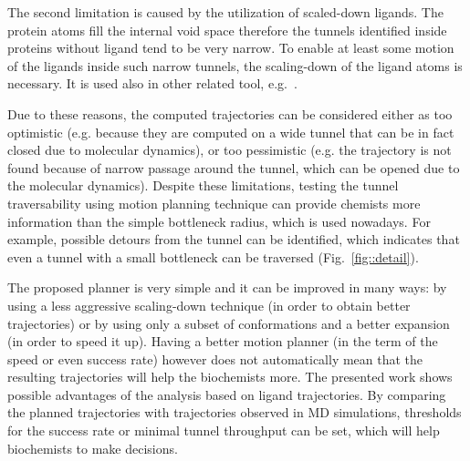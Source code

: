\documentclass[usletter, 10pt, conference]{ieeeconf} %
\def\rv{R_{tunnel}}
\def\L{\mathcal{L}}
\begin{document}
The second limitation is caused by the utilization of scaled-down ligands.
The protein atoms fill the internal void space therefore the tunnels identified inside proteins without ligand tend
to be very narrow.
To enable at least some motion of the ligands inside such narrow tunnels, the scaling-down of the ligand atoms is necessary.
It is used also in other related tool, e.g.~\cite{cortes2005path}.

Due to these reasons, the computed trajectories can be considered either as too optimistic
(e.g. because they are computed on a wide tunnel that can be in fact closed due to molecular dynamics),
or too pessimistic (e.g. the trajectory is not found because of narrow passage around the tunnel, which can be 
opened due to the molecular dynamics).
Despite these limitations, testing the tunnel traversability using motion planning technique can provide chemists more information
than the simple bottleneck radius, which is used nowadays.
For example, possible detours from the tunnel can be identified, which indicates that even a tunnel with a small
bottleneck can be traversed (Fig.~\ref{fig::detail}).


The proposed planner is very simple and it can be improved in many ways: by using a less aggressive scaling-down technique (in order
to obtain better trajectories) or by using only a subset of conformations and a better expansion (in order to speed it up).
Having a better motion planner (in the term of the speed or even success rate) however does not automatically mean that the resulting trajectories will help the biochemists more.
The presented work shows possible advantages of the analysis based on ligand trajectories.
By comparing the planned trajectories with trajectories observed in MD simulations, thresholds for the success rate or minimal tunnel throughput can be set, which will help biochemists to make decisions.



\end{document}
